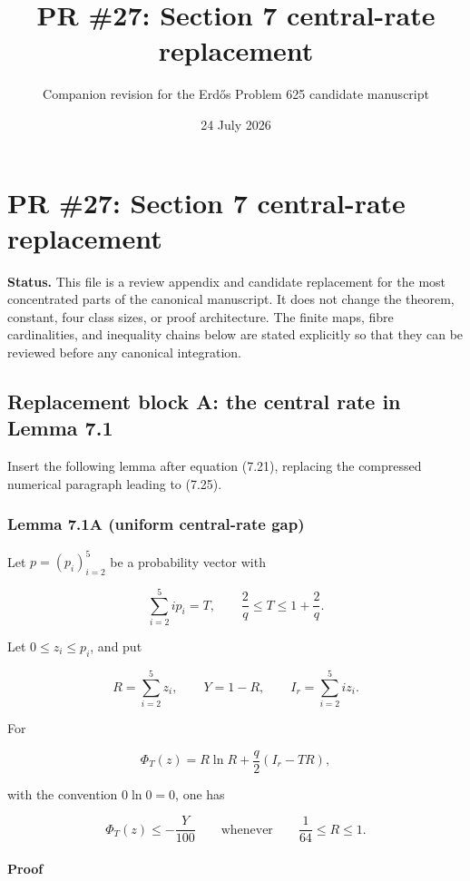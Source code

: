\documentclass[11pt]{article}
\title{PR \#27: Section 7 central-rate replacement}
\author{Companion revision for the Erd\H{o}s Problem 625 candidate manuscript}
\date{24 July 2026}
\begin{document}
\maketitle
\section{PR \#27: Section 7 central-rate replacement}\label{pr-27-section-7-central-rate-replacement}

\textbf{Status.} This file is a review appendix and candidate replacement for the most concentrated parts of the canonical manuscript. It does not change the theorem, constant, four class sizes, or proof architecture. The finite maps, fibre cardinalities, and inequality chains below are stated explicitly so that they can be reviewed before any canonical integration.

\subsection{Replacement block A: the central rate in Lemma 7.1}\label{replacement-block-a-the-central-rate-in-lemma-7.1}

Insert the following lemma after equation (7.21), replacing the compressed numerical paragraph leading to (7.25).

\subsubsection{Lemma 7.1A (uniform central-rate gap)}\label{lemma-7.1a-uniform-central-rate-gap}

Let \(p=(p_i)_{i=2}^5\) be a probability vector with

\[
 \sum_{i=2}^5 i p_i=T,
 \qquad
 \frac2q\le T\le1+\frac2q.
\]

Let \(0\le z_i\le p_i\), and put

\[
 R=\sum_{i=2}^5 z_i,\qquad
 Y=1-R,\qquad
 I_r=\sum_{i=2}^5 i z_i.
\]

For

\[
 \Phi_T(z)=R\ln R+\frac q2(I_r-TR),
\]

with the convention \(0\ln0=0\), one has

\[
 \Phi_T(z)\le-\frac{Y}{100}
 \qquad\text{whenever}\qquad
 \frac1{64}\le R\le1.
 \tag{7.21a}
\]

\paragraph{Proof}\label{proof}
\end{document}
